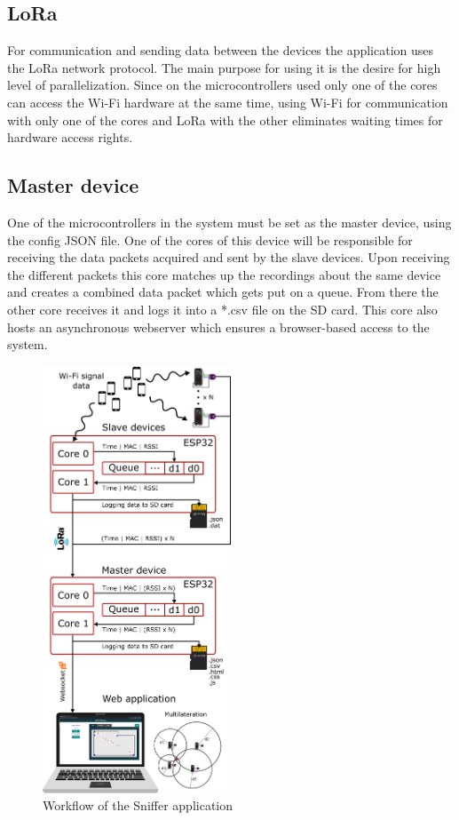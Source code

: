 \documentclass[11pt,a4paper]{article}
\begin{document}
\subsection{LoRa}
For communication and sending data between the devices the application uses the LoRa network protocol. The main purpose for using it is the desire for high level of parallelization. Since on the microcontrollers used only one of the cores can access the Wi-Fi hardware at the same time, using Wi-Fi for communication with only one of the cores and LoRa with the other eliminates waiting times for hardware access rights.

\subsection{Master device}
One of the microcontrollers in the system must be set as the master device, using the config JSON file. One of the cores of this device will be responsible for receiving the data packets acquired and sent by the slave devices. Upon receiving the different packets this core matches up the recordings about the same device and creates a combined data packet which gets put on a queue. From there the other core receives it and logs it into a *.csv file on the SD card. This core also hosts an asynchronous webserver which ensures a browser-based access to the system.\\[1cm]

\begin{figure}[H]
    \centering
    \includegraphics[width = 0.5\textwidth]{figures/posterIllustration.png}
    \caption{Workflow of the Sniffer application}
    \label{fig:workflow}
\end{figure}
\end{document}
